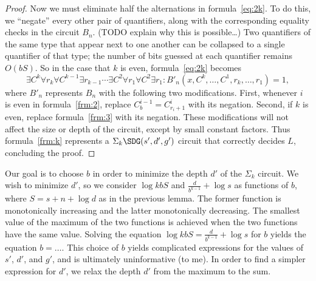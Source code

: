 \documentclass{article}
\begin{document}
\begin{proof}
  Now we must eliminate half the alternations in formula~\eqref{eq:2k}.
  To do this, we ``negate'' every other pair of quantifiers, along with the corresponding equality checks in the circuit $B_n$.
  (TODO explain why this is possible\ldots)
  Two quantifiers of the same type that appear next to one another can be collapsed to a single quantifier of that type; the number of bits guessed at each quantifier remains $O(b S)$.
  So in the case that $k$ is even, formula~\eqref{eq:2k} becomes
  \begin{equation}\label{frm:k}
    \exists C^k \forall r_k \forall C^{k - 1} \exists r_{k - 1} \dotsb \exists C^2 \forall r_1 \forall C^2 \exists r_1 \colon B'_n(x, C^k, \dotsc, C^1, r_k, \dotsc, r_1) = 1,
  \end{equation}
  where $B'_n$ represents $B_n$ with the following two modifications.
  First, whenever $i$ is even in formula~\eqref{frm:2}, replace $C^{i - 1}_b = C^i_{r_i + 1}$ with its negation.
  Second, if $k$ is even, replace formula~\eqref{frm:3} with its negation.
  These modifications will not affect the size or depth of the circuit, except by small constant factors.
  Thus formula~\eqref{frm:k} represents a $\Sigma_k \SDG(s', d', g')$ circuit that correctly decides $L$, concluding the proof.
\end{proof}

Our goal is to choose $b$ in order to minimize the depth $d'$ of the $\Sigma_k$ circuit.
We wish to minimize $d'$, so we consider $\log k b S$ and $\frac{d}{b^{k - 1}} + \log s$ as functions of $b$, where $S = s + n + \log d$ as in the previous lemma.
The former function is monotonically increasing and the latter monotonically decreasing.
The smallest value of the maximum of the two functions is achieved when the two functions have the same value.
Solving the equation $\log k b S = \frac{d}{b^{k - 1}} + \log s$ for $b$ yields the equation $b = \ldots$.
This choice of $b$ yields complicated expressions for the values of $s'$, $d'$, and $g'$, and is ultimately uninformative (to me).
In order to find a simpler expression for $d'$, we relax the depth $d'$ from the maximum to the sum.
\end{document}
